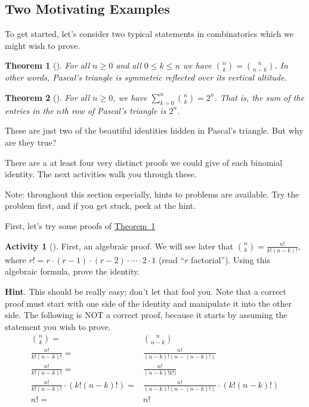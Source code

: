 \documentclass[10pt,]{book}
\theoremstyle{plain}
\newtheorem{theorem}{Theorem}[section]
\theoremstyle{definition}
\theoremstyle{definition}
\theoremstyle{definition}
\newtheorem{activity}[project]{Activity}
\theoremstyle{definition}
\numberwithin{equation}{chapter}
\newcommand{\amp}{&}
\begin{document}
\subsection[{Two Motivating Examples}]{Two Motivating Examples}\label{subsec-basic-proofs-examples}
\hypertarget{p-451}{}%
To get started, let's consider two typical statements in combinatorics which we might wish to prove.%
\begin{theorem}[{}]\label{thm-pascalsym}
\hypertarget{p-452}{}%
For all \(n \ge 0\) and all \(0 \le k \le n\) we have \(\binom{n}{k} = \binom{n}{n-k}\).  In other words, Pascal's triangle is symmetric reflected over its vertical altitude.%
\end{theorem}
\begin{theorem}[{}]\label{thm-pascalrowsum}
\hypertarget{p-453}{}%
For all \(n \ge 0\), we have \(\sum_{k=0}^n \binom{n}{k} = 2^n\).  That is, the sum of the entries in the \(n\)th row of Pascal's triangle is \(2^n\).%
\end{theorem}
\hypertarget{p-454}{}%
These are just two of the beautiful identities hidden in Pascal's triangle.  But why are they true?%
\par
\hypertarget{p-455}{}%
There are a at least four very distinct proofs we could give of each binomial identity.  The next activities walk you through these.%
\par
\hypertarget{p-456}{}%
Note: throughout this section especially, hints to problems are available.  Try the problem first, and if you get stuck, peek at the hint.%
\par
\hypertarget{p-457}{}%
First, let's try some proofs of \hyperref[thm-pascalsym]{Theorem~\ref{thm-pascalsym}}%
\begin{activity}[]\label{activity-15}
\hypertarget{p-458}{}%
First, an algebraic proof.  We will see later that \(\binom{n}{k} = \frac{n!}{k!(n-k)!}\), where \(r! = r \cdot (r-1) \cdot (r-2) \cdot\cdots\cdot 2\cdot 1\) (read ``\(r\) factorial'').  Using this algebraic formula, prove the identity.%
\par\smallskip%
\noindent\textbf{Hint}.\hypertarget{hint-4}{}\quad%
\hypertarget{p-459}{}%
This should be really easy; don't let that fool you.  Note that a correct proof must start with one side of the identity and manipulate it into the other side.  The following is NOT a correct proof, because it starts by assuming the statement you wish to prove.%
\begin{align*}
\binom{n}{k}  = \amp \binom{n}{n-k}\\
\frac{n!}{k!(n-k)!} =  \amp \frac{n!}{(n-k)!(n-(n-k)!)}\\
\frac{n!}{k!(n-k)!} =  \amp \frac{n!}{(n-k)!k!)}\\
\frac{n!}{k!(n-k)!} \cdot (k!(n-k)!)=  \amp \frac{n!}{(n-k)!(n-(n-k)!)}\cdot(k!(n-k)!)\\
n! =  \amp n!
\end{align*}
%
\end{activity}
\end{document}
